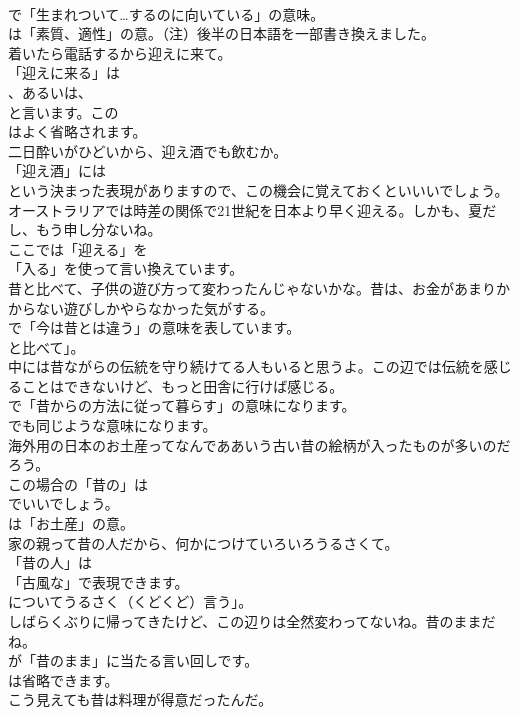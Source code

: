 \documentclass[8pt]{extreport}
\begin{document}
\begin{CJK}{UTF8}{min}
\\	で「生まれついて…するのに向いている」の意味。
\\	は「素質、適性」の意。（注）後半の日本語を一部書き換えました。	
\\	着いたら電話するから迎えに来て。 
\\	「迎えに来る」は
\\	、あるいは、
\\	と言います。この
\\	はよく省略されます。	
\\	二日酔いがひどいから、迎え酒でも飲むか。 
\\	「迎え酒」には
\\	という決まった表現がありますので、この機会に覚えておくといいいでしょう。	
\\	オーストラリアでは時差の関係で21世紀を日本より早く迎える。しかも、夏だし、もう申し分ないね。 
\\	ここでは「迎える」を
\\	「入る」を使って言い換えています。	
\\	昔と比べて、子供の遊び方って変わったんじゃないかな。昔は、お金があまりかからない遊びしかやらなかった気がする。 
\\	で「今は昔とは違う」の意味を表しています。
\\	と比べて」。	
\\	中には昔ながらの伝統を守り続けてる人もいると思うよ。この辺では伝統を感じることはできないけど、もっと田舎に行けば感じる。 
\\	で「昔からの方法に従って暮らす」の意味になります。
\\	でも同じような意味になります。	
\\	海外用の日本のお土産ってなんでああいう古い昔の絵柄が入ったものが多いのだろう。 
\\	この場合の「昔の」は 
\\	でいいでしょう。
\\	は「お土産」の意。	
\\	家の親って昔の人だから、何かにつけていろいろうるさくて。 
\\	「昔の人」は
\\	「古風な」で表現できます。
\\	についてうるさく（くどくど）言う」。	
\\	しばらくぶりに帰ってきたけど、この辺りは全然変わってないね。昔のままだね。 
\\	が「昔のまま」に当たる言い回しです。
\\	は省略できます。	
\\	こう見えても昔は料理が得意だったんだ。 

\end{CJK}
\end{document}
